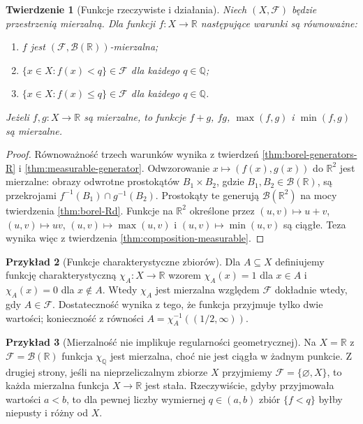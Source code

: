 \documentclass[11pt,a4paper,oneside]{book}
\numberwithin{equation}{chapter}
\theoremstyle{plain}
\newtheorem{twierdzenie}{Twierdzenie}[chapter]
\theoremstyle{definition}
\newtheorem{przyklad}[twierdzenie]{Przykład}
\theoremstyle{remark}
\begin{document}
\begin{twierdzenie}[Funkcje rzeczywiste i działania]
\label{thm:measurable-real}
Niech $(X,\mathcal F)$ będzie przestrzenią mierzalną.
Dla funkcji $f:X\to\mathbb R$ następujące warunki są równoważne:
\begin{enumerate}
\item $f$ jest $(\mathcal F,\mathcal B(\mathbb R))$-mierzalna;
\item $\{x\in X:f(x)<q\}\in\mathcal F$ dla każdego $q\in\mathbb Q$;
\item $\{x\in X:f(x)\leq q\}\in\mathcal F$ dla każdego $q\in\mathbb Q$.
\end{enumerate}
Jeżeli $f,g:X\to\mathbb R$ są mierzalne, to funkcje
$f+g$, $fg$, $\max(f,g)$ i $\min(f,g)$ są mierzalne.
\end{twierdzenie}
\begin{proof}
Równoważność trzech warunków wynika z twierdzeń
\ref{thm:borel-generators-R} i \ref{thm:measurable-generator}.
Odwzorowanie $x\mapsto(f(x),g(x))$ do $\mathbb R^2$ jest mierzalne:
obrazy odwrotne prostokątów $B_1\times B_2$, gdzie
$B_1,B_2\in\mathcal B(\mathbb R)$, są przekrojami
$f^{-1}(B_1)\cap g^{-1}(B_2)$. Prostokąty te generują
$\mathcal B(\mathbb R^2)$ na mocy twierdzenia
\ref{thm:borel-Rd}. Funkcje na $\mathbb R^2$ określone przez
$(u,v)\mapsto u+v$, $(u,v)\mapsto uv$,
$(u,v)\mapsto\max(u,v)$ i $(u,v)\mapsto\min(u,v)$ są ciągłe.
Teza wynika więc z twierdzenia \ref{thm:composition-measurable}.
\end{proof}

\begin{przyklad}[Funkcje charakterystyczne zbiorów]
Dla $A\subseteq X$ definiujemy funkcję charakterystyczną
$\chi_A:X\to\mathbb R$ wzorem
$\chi_A(x)=1$ dla $x\in A$ i $\chi_A(x)=0$ dla $x\notin A$.
Wtedy $\chi_A$ jest mierzalna względem $\mathcal F$
dokładnie wtedy, gdy $A\in\mathcal F$.
Dostateczność wynika z tego, że funkcja przyjmuje tylko dwie
wartości; konieczność z równości
$A=\chi_A^{-1}((1/2,\infty))$.
\end{przyklad}

\begin{przyklad}[Mierzalność nie implikuje regularności geometrycznej]
Na $X=\mathbb R$ z $\mathcal F=\mathcal B(\mathbb R)$ funkcja
$\chi_{\mathbb Q}$ jest mierzalna, choć nie jest ciągła
w żadnym punkcie. Z drugiej strony, jeśli na nieprzeliczalnym
zbiorze $X$ przyjmiemy $\mathcal F=\{\varnothing,X\}$, to
każda mierzalna funkcja $X\to\mathbb R$ jest stała. Rzeczywiście,
gdyby przyjmowała wartości $a<b$, to dla pewnej liczby wymiernej
$q\in(a,b)$ zbiór $\{f<q\}$ byłby niepusty i różny od $X$.
\end{przyklad}
\end{document}
